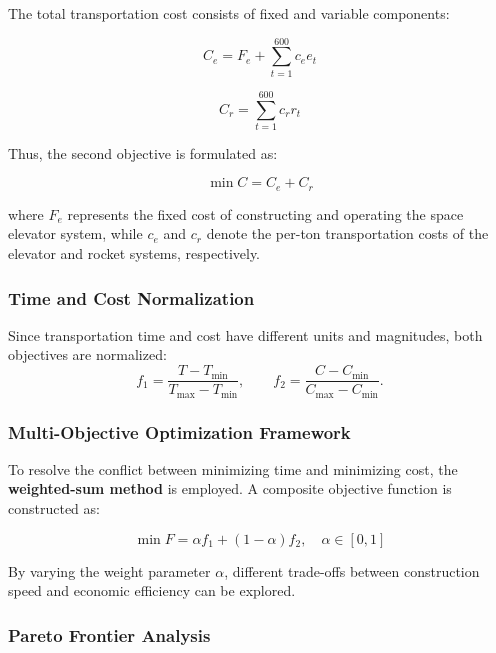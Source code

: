 \documentclass{mcmthesis}
\begin{document}
The total transportation cost consists of fixed and variable components:

\begin{equation}
    C_e = F_e + \sum_{t=1}^{600} c_e e_t
\end{equation}

\begin{equation}
    C_r = \sum_{t=1}^{600} c_r r_t
\end{equation}

Thus, the second objective is formulated as:

\begin{equation}
    \min C = C_e + C_r
\end{equation}

where $F_e$ represents the fixed cost of constructing and operating the space elevator system, while $c_e$ and $c_r$ denote the per-ton transportation costs of the elevator and rocket systems, respectively.

\subsubsection{Time and Cost Normalization}

Since transportation time and cost have different units and magnitudes, both objectives are normalized:
\begin{equation}
    f_1 = \frac{T - T_{\min}}{T_{\max} - T_{\min}}, \qquad
    f_2 = \frac{C - C_{\min}}{C_{\max} - C_{\min}}.
\end{equation}

\subsubsection{Multi-Objective Optimization Framework}

To resolve the conflict between minimizing time and minimizing cost, the \textbf{weighted-sum method} is employed.
A composite objective function is constructed as:

\begin{equation}
    \min F = \alpha f_1
    + (1-\alpha)f_2, \quad \alpha \in [0,1]
\end{equation}

By varying the weight parameter $\alpha$, different trade-offs between construction speed and economic efficiency can be explored.

\subsubsection{Pareto Frontier Analysis}
\end{document}
